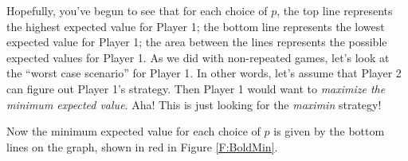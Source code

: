 \begin{figure}
\begin{center}
   \label{F:BoldHalf}
\end{center}   
\end{figure}

Hopefully, you've begun to see that for each choice of $p$, the top line represents the highest expected value for Player 1; the bottom line represents the lowest expected value for Player 1; the area between the lines represents the possible expected values for Player 1. As we did with non-repeated games, let's look at the ``worst case scenario'' for Player 1. In other words, let's assume that Player 2 can figure out Player 1's strategy. Then Player 1 would want to \emph{maximize the minimum expected value}. Aha! This is just looking for the \emph{maximin} strategy! 

Now the minimum expected value for each choice of $p$ is given by the bottom lines on the graph, shown in red in Figure \ref{F:BoldMin}.


